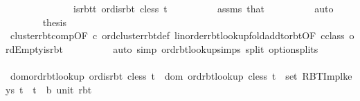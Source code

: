 \begin{isabellebody}
\ \ \ \ \isamarkupfalse%
\ {\isacharminus}{\kern0pt}\isanewline
\ \ \ \ \ \ \isamarkupfalse%
\ is{\isacharunderscore}{\kern0pt}rbt{\isacharunderscore}{\kern0pt}t{\isacharcolon}{\kern0pt}\ {\isachardoublequoteopen}ord{\isachardot}{\kern0pt}is{\isacharunderscore}{\kern0pt}rbt\ cless\ t{\isachardoublequoteclose}\isanewline
\ \ \ \ \ \ \ \ \isamarkupfalse%
\ assms\ that\isanewline
\ \ \ \ \ \ \ \ \isamarkupfalse%
\ auto\isanewline
\ \ \ \ \ \ \isamarkupfalse%
\ {\isacharquery}{\kern0pt}thesis\isanewline
\ \ \ \ \ \ \ \ \isamarkupfalse%
\ cluster{\isacharunderscore}{\kern0pt}rbt{\isacharunderscore}{\kern0pt}comp{\isacharbrackleft}{\kern0pt}OF\ c{\isacharbrackright}{\kern0pt}\ ord{\isachardot}{\kern0pt}cluster{\isacharunderscore}{\kern0pt}rbt{\isacharunderscore}{\kern0pt}def\ linorder{\isachardot}{\kern0pt}rbt{\isacharunderscore}{\kern0pt}lookup{\isacharunderscore}{\kern0pt}fold{\isacharunderscore}{\kern0pt}add{\isacharunderscore}{\kern0pt}to{\isacharunderscore}{\kern0pt}rbt{\isacharbrackleft}{\kern0pt}OF\ c{\isacharunderscore}{\kern0pt}class\ ord{\isachardot}{\kern0pt}Empty{\isacharunderscore}{\kern0pt}is{\isacharunderscore}{\kern0pt}rbt{\isacharbrackright}{\kern0pt}\isanewline
\ \ \ \ \ \ \ \ \isamarkupfalse%
\ {\isacharparenleft}{\kern0pt}auto\ simp{\isacharcolon}{\kern0pt}\ ord{\isachardot}{\kern0pt}rbt{\isacharunderscore}{\kern0pt}lookup{\isachardot}{\kern0pt}simps\ split{\isacharcolon}{\kern0pt}\ option{\isachardot}{\kern0pt}splits{\isacharparenright}{\kern0pt}\isanewline
\ \ \ \ \isamarkupfalse%
\isanewline
\ \ \ \ \isamarkupfalse%
\ dom{\isacharunderscore}{\kern0pt}ord{\isacharunderscore}{\kern0pt}rbt{\isacharunderscore}{\kern0pt}lookup{\isacharcolon}{\kern0pt}\ {\isachardoublequoteopen}ord{\isachardot}{\kern0pt}is{\isacharunderscore}{\kern0pt}rbt\ cless\ t\ {\isasymLongrightarrow}\ dom\ {\isacharparenleft}{\kern0pt}ord{\isachardot}{\kern0pt}rbt{\isacharunderscore}{\kern0pt}lookup\ cless\ t{\isacharparenright}{\kern0pt}\ {\isacharequal}{\kern0pt}\ set\ {\isacharparenleft}{\kern0pt}RBT{\isacharunderscore}{\kern0pt}Impl{\isachardot}{\kern0pt}keys\ t{\isacharparenright}{\kern0pt}{\isachardoublequoteclose}\ \ t\ {\isacharcolon}{\kern0pt}{\isacharcolon}{\kern0pt}\ {\isachardoublequoteopen}{\isacharparenleft}{\kern0pt}{\isacharprime}{\kern0pt}b{\isacharcomma}{\kern0pt}\ unit{\isacharparenright}{\kern0pt}\ rbt{\isachardoublequoteclose}\isanewline
\ \ \ \ \ \ \isamarkupfalse%

\end{isabellebody}
